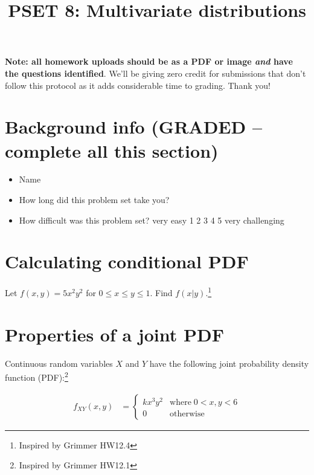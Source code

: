 \documentclass[
]{article}
\title{PSET 8: Multivariate distributions}
\author{}
\date{\vspace{-2.5em}}
\begin{document}
\maketitle

\textbf{Note: all homework uploads should be as a PDF or image
\emph{and} have the questions identified}. We'll be giving zero credit
for submissions that don't follow this protocol as it adds considerable
time to grading. Thank you!

\section{Background info (GRADED -- complete all this
section)}\label{background-info-graded-complete-all-this-section}

\begin{itemize}
\item
  Name
\item
  How long did this problem set take you?
\item
  How difficult was this problem set? very easy 1 2 3 4 5 very
  challenging
\end{itemize}

\section{Calculating conditional PDF}\label{calculating-conditional-pdf}

Let \(f(x,y) = 5x^2y^2\) for \(0 \leq x \leq y \leq 1\). Find
\(f(x|y)\).\footnote{Inspired by Grimmer HW12.4}

\hfill\break
\hfill\break
\hfill\break
\hfill\break
\hfill\break
\hfill\break
\hfill\break
\hfill\break
\hfill\break

\section{Properties of a joint PDF}\label{properties-of-a-joint-pdf}

Continuous random variables \(X\) and \(Y\) have the following joint
probability density function (PDF):\footnote{Inspired by Grimmer HW12.1}

\[
\begin{aligned}
f_{XY} (x, y) &= \begin{cases}
k x^3 y^2 & \text{where} \; 0 < x, y < 6 \\
0 & \text{otherwise}
\end{cases}
\end{aligned}
\]
\end{document}
